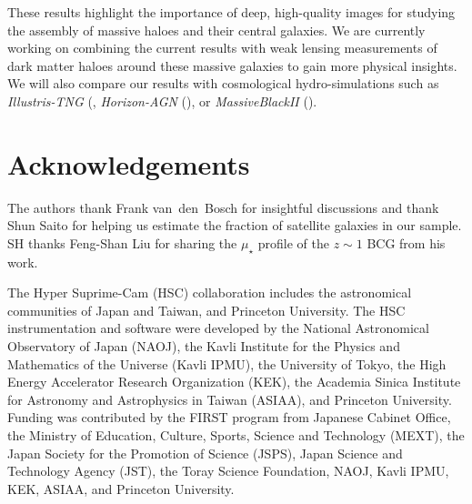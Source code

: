 \documentclass[a4paper,fleqn,usenatbib]{mnras}
\def\mden{{$\mu_{\star}$}}
\begin{document}
    These results highlight the importance of deep, high-quality images for studying 
    the assembly of massive haloes and their central galaxies. 
    We are currently working on combining the current results with weak lensing 
    measurements of dark matter haloes around these massive galaxies to gain more physical 
    insights. 
    We will also compare our results with cosmological hydro-simulations 
    such as 
    \textit{Illustris-TNG} (\citealt{Pillepich2017a, Pillepich2017b, Weinberger2017}, 
    \textit{Horizon-AGN} (\citealt{Dubois2014}), or 
    \textit{MassiveBlackII} (\citealt{Khandai2015}).


\section*{Acknowledgements}

  The authors thank Frank van~den~Bosch for insightful discussions and thank 
  Shun Saito for helping us estimate the fraction of satellite galaxies in our sample.
  SH thanks Feng-Shan Liu for sharing the \mden{} profile of the $z\sim1$ BCG from 
  his work.

  The Hyper Suprime-Cam (HSC) collaboration includes the astronomical communities of 
  Japan and Taiwan, and Princeton University.  The HSC instrumentation and software were
  developed by the National Astronomical Observatory of Japan (NAOJ), the Kavli Institute
  for the Physics and Mathematics of the Universe (Kavli IPMU), the University of Tokyo,
  the High Energy Accelerator Research Organization (KEK), the Academia Sinica Institute
  for Astronomy and Astrophysics in Taiwan (ASIAA), and Princeton University.  
  Funding was contributed by the FIRST program from Japanese Cabinet Office, the Ministry 
  of Education, Culture, Sports, Science and Technology (MEXT), the Japan Society for 
  the Promotion of Science (JSPS), Japan Science and Technology Agency (JST), the
  Toray Science Foundation, NAOJ, Kavli IPMU, KEK, ASIAA, and Princeton University.
   
\end{document}
